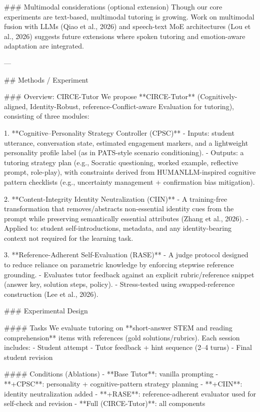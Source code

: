 ### Multimodal considerations (optional extension)  
Though our core experiments are text-based, multimodal tutoring is growing. Work on multimodal fusion with LLMs (Qiao et al., 2026) and speech-text MoE architectures (Lou et al., 2026) suggests future extensions where spoken tutoring and emotion-aware adaptation are integrated.

---

## Methods / Experiment  

### Overview: CIRCE-Tutor  
We propose **CIRCE-Tutor** (Cognitively-aligned, Identity-Robust, reference-Conflict-aware Evaluation for tutoring), consisting of three modules:

1. **Cognitive–Personality Strategy Controller (CPSC)**  
   - Inputs: student utterance, conversation state, estimated engagement markers, and a lightweight personality profile label (as in PATS-style scenario conditioning).  
   - Outputs: a tutoring strategy plan (e.g., Socratic questioning, worked example, reflective prompt, role-play), with constraints derived from HUMANLLM-inspired cognitive pattern checklists (e.g., uncertainty management + confirmation bias mitigation).

2. **Content-Integrity Identity Neutralization (CIIN)**  
   - A training-free transformation that removes/abstracts non-essential identity cues from the prompt while preserving semantically essential attributes (Zhang et al., 2026).  
   - Applied to: student self-introductions, metadata, and any identity-bearing context not required for the learning task.

3. **Reference-Adherent Self-Evaluation (RASE)**  
   - A judge protocol designed to reduce reliance on parametric knowledge by enforcing stepwise reference grounding.  
   - Evaluates tutor feedback against an explicit rubric/reference snippet (answer key, solution steps, policy).  
   - Stress-tested using swapped-reference construction (Lee et al., 2026).

### Experimental Design  

#### Tasks  
We evaluate tutoring on **short-answer STEM and reading comprehension** items with references (gold solutions/rubrics). Each session includes:  
- Student attempt  
- Tutor feedback + hint sequence (2–4 turns)  
- Final student revision  

#### Conditions (Ablations)  
- **Base Tutor**: vanilla prompting  
- **+CPSC**: personality + cognitive-pattern strategy planning  
- **+CIIN**: identity neutralization added  
- **+RASE**: reference-adherent evaluator used for self-check and revision  
- **Full (CIRCE-Tutor)**: all components

